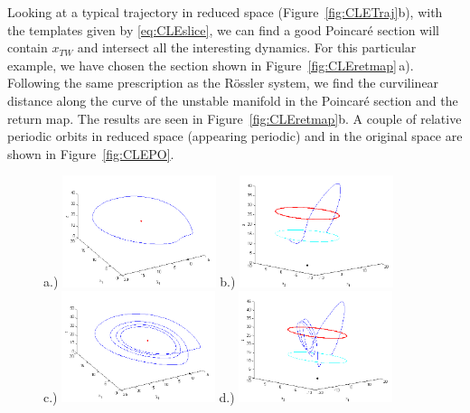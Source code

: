 \documentclass[10pt,letter]{article}
\begin{document}
Looking at a typical trajectory in reduced space
(Figure~\ref{fig:CLETraj}b), with the templates given by
\ref{eq:CLEslice}, we can find a good Poincar\'e section will contain
$x_{TW}$ and intersect all the interesting dynamics. For this particular
example, we have chosen the section shown in Figure~\ref{fig:CLEretmap}\,a).
Following the same prescription as the R\"ossler system, we find the
curvilinear distance along the curve of the unstable manifold in the
Poincar\'e section and the return map.  The results are seen in
Figure~\ref{fig:CLEretmap}b.  A couple of relative periodic orbits in
reduced space (appearing periodic) and in the original space are shown in
Figure~\ref{fig:CLEPO}.
 \begin{figure}
\centering
a.)  \includegraphics[width=0.40\textwidth]{Figs/Section3/kc1cyclec.png}
b.)
  \includegraphics[width=0.40\textwidth]{Figs/Section3/kc1cycleunredc.png}
\\
c.)
  \includegraphics[width=0.40\textwidth]{Figs/Section3/kc4cyclec.png}
d.)
  \includegraphics[width=0.40\textwidth]{Figs/Section3/kc4cyclewithcirclec.png}

\end{figure}
\end{document}
